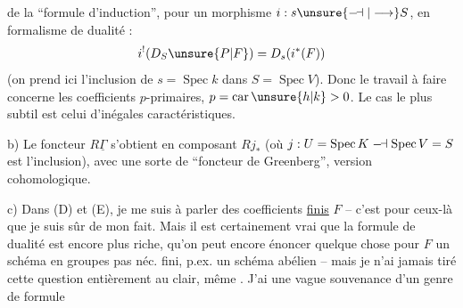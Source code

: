 de la ``formule d'induction'', pour un morphisme $i:s\unsure{\relbar\joinrel\dashv|\longrightarrow}S$, en formalisme de dualité :
\[
 i^!(D_S\unsure{P|F})=D_s(i^*(F))
\]
(on prend ici l'inclusion de $s=\operatorname{Spec}k$ dans $S=\operatorname{Spec}V$). Donc le travail à faire concerne les coefficients $p$-primaires, $p=\operatorname{car}\unsure{h|k}>0$. Le cas le plus subtil est celui d'inégales caractéristiques.

b) Le foncteur $R\underline{\Gamma}$ s'obtient en composant $Rj_*$ (où $j:U=\operatorname{Spec}K\mathrel{\relbar\joinrel\dashv}\operatorname{Spec}V=S$ est l'inclusion), avec une sorte de ``foncteur de Greenberg'', version cohomologique.

c) Dans (D) et (E), je me suis  à parler des coefficients \uline{finis} $F$ -- c'est pour ceux-là que je suis sûr de mon fait. Mais il est certainement vrai que la formule de dualité est encore plus riche, qu'on peut encore énoncer quelque chose  pour  $F$ un schéma en groupes pas néc. fini, p.ex. un schéma abélien  -- mais je n'ai jamais tiré cette question entièrement au clair, même . J'ai une vague souvenance d'un genre de formule

